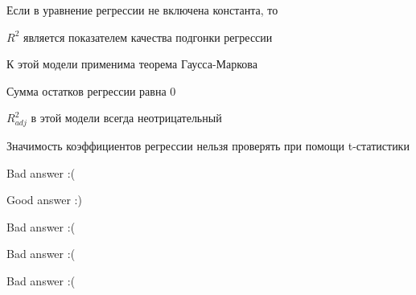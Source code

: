 
\begin{question}
Если в уравнение регрессии не включена константа, то
\begin{answerlist}
  \item \(R^2\) является показателем качества подгонки регрессии
  \item К этой модели применима теорема Гаусса-Маркова
  \item Сумма остатков регрессии равна 0
  \item \(R^2_{adj}\) в этой модели всегда неотрицательный
  \item Значимость коэффициентов регрессии нельзя проверять при помощи t-статистики
\end{answerlist}
\end{question}

\begin{solution}
\begin{answerlist}
  \item Bad answer :(
  \item Good answer :)
  \item Bad answer :(
  \item Bad answer :(
  \item Bad answer :(
\end{answerlist}
\end{solution}

